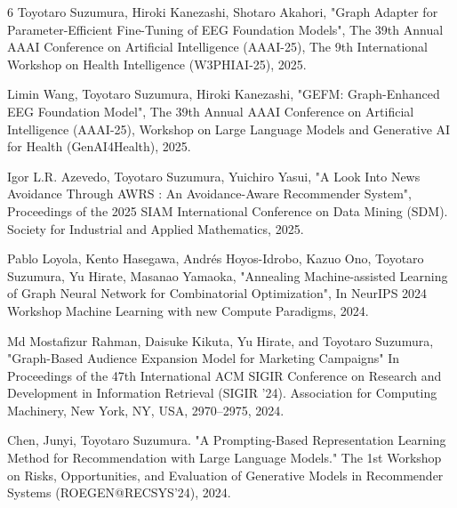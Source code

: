 








\begin{査読付}{6}
Toyotaro Suzumura, Hiroki Kanezashi, Shotaro Akahori, "Graph Adapter for Parameter-Efficient Fine-Tuning of EEG Foundation Models", The 39th Annual AAAI Conference on Artificial Intelligence (AAAI-25), The 9th International Workshop on Health Intelligence (W3PHIAI-25), 2025.

Limin Wang, Toyotaro Suzumura, Hiroki Kanezashi, "GEFM: Graph-Enhanced EEG Foundation Model", The 39th Annual AAAI Conference on Artificial Intelligence (AAAI-25), Workshop on Large Language Models and Generative AI for Health (GenAI4Health), 2025.

 Igor L.R. Azevedo, Toyotaro Suzumura, Yuichiro Yasui, "A Look Into News Avoidance Through AWRS : An Avoidance-Aware Recommender System", Proceedings of the 2025 SIAM International Conference on Data Mining (SDM). Society for Industrial and Applied Mathematics, 2025.




Pablo Loyola, Kento Hasegawa, Andrés Hoyos-Idrobo, Kazuo Ono, Toyotaro Suzumura, Yu Hirate, Masanao Yamaoka, "Annealing Machine-assisted Learning of Graph Neural Network for Combinatorial Optimization", In NeurIPS 2024 Workshop Machine Learning with new Compute Paradigms, 2024.

Md Mostafizur Rahman, Daisuke Kikuta, Yu Hirate, and Toyotaro Suzumura, "Graph-Based Audience Expansion Model for Marketing Campaigns" In Proceedings of the 47th International ACM SIGIR Conference on Research and Development in Information Retrieval (SIGIR '24). Association for Computing Machinery, New York, NY, USA, 2970–2975, 2024.

Chen, Junyi, Toyotaro Suzumura. "A Prompting-Based Representation Learning Method for Recommendation with Large Language Models." The 1st Workshop on Risks, Opportunities, and Evaluation of Generative Models in Recommender Systems (ROEGEN@RECSYS'24), 2024.

\end{査読付}

